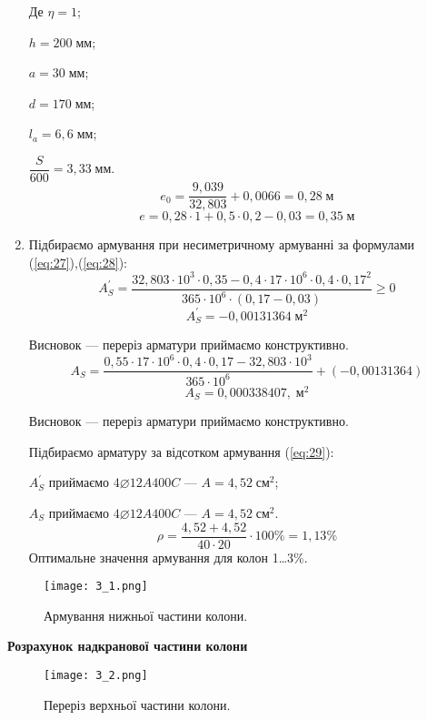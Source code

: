 \documentclass[a4paper,14pt]{article}
\begin{document}
\begin{enumerate}
        Де $\eta = 1$;

        $h = 200\;\textit{мм}$;

        $a = 30\;\textit{мм}$;

        $d = 170\;\textit{мм}$;

        $l_a = 6,6\;\textit{мм}$;

        $\dfrac{S}{600} = 3,33\;\textit{мм}$.
        $$e_0 = \dfrac{9,039}{32,803} + 0,0066 = 0,28\;\textit{м}$$
        $$e = 0,28 \cdot 1 +  0,5 \cdot 0,2 - 0,03 = 0,35\;\textit{м}$$
    \item Підбираємо армування при несиметричному армуванні за формулами\\(\ref{eq:27}),(\ref{eq:28}):
        $$A_S^\prime = \dfrac{32,803 \cdot 10^3 \cdot 0,35 - 0,4 \cdot 17 \cdot 10^6 \cdot 0,4 \cdot 0,17^2}{365 \cdot 10^6 \cdot (0,17 - 0,03)} \geqslant 0$$
        $$A_S^\prime = -0,00131364\;\textit{м}^2$$

        Висновок --- переріз арматури приймаємо конструктивно.
        $$A_S = \dfrac{0,55 \cdot 17 \cdot 10^6 \cdot 0,4 \cdot 0,17 - 32,803 \cdot 10^3}{365 \cdot 10^6} +(-0,00131364)$$
        $$A_S = 0,000338407,\;\textit{м}^2$$

        Висновок --- переріз арматури приймаємо конструктивно.

        Підбираємо арматуру за відсотком армування (\ref{eq:29}):

        $A_S^\prime$ приймаємо $4\varnothing12A400C$ --- $A = 4,52\;\textit{см}^2$;

        $A_S$ приймаємо $4\varnothing12A400C$ --- $A = 4,52\;\textit{см}^2$.
        $$\rho = \dfrac{4,52 + 4,52}{40 \cdot 20} \cdot 100\% = 1,13\%$$
        Оптимальне значення армування для колон 1\ldots 3\%.
\end{enumerate}
\begin{figure}[h!]
    \begin{center}
        \texttt{[image: 3\_1.png]}
        \caption{Армування нижньої частини колони.}\label{ris3_1} 
    \end{center}
\end{figure}
\textbf{Розрахунок надкранової частини колони} %
\begin{figure}[h!]
    \begin{center}
        \texttt{[image: 3\_2.png]}
        \caption{Переріз верхньої частини колони.}\label{ris3_2} 
    \end{center}
\end{figure}
\end{document}

